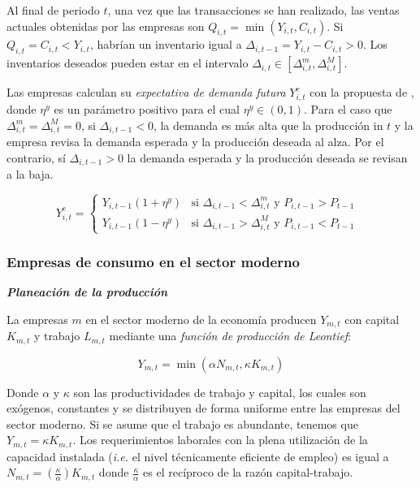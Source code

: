 \documentclass[12pt,a4paper]{article}
\begin{document}
Al final de periodo $t$, una vez que las transacciones se han realizado, las ventas actuales obtenidas por las empresas son $Q_{i,t}=\min(Y_{i,t},C_{i,t})$. Si $Q_{i,t}= C_{i,t} < Y_{i,t}$, habrían un inventario igual a $\Delta_{i,t-1}=Y_{i,t}-C_{i,t}>0$. Los inventarios deseados pueden estar en el intervalo $\Delta_{i,t} \in [\Delta_{i,t}^m,\Delta_{i,t}^M]$.

Las empresas calculan su \textit{expectativa de demanda futura} $Y_{i,t}^e$ con la propuesta de \cite{DAWID201863}, donde $\eta^y$ es un parámetro positivo para el cual $\eta^y \in (0,1)$. Para el caso que $\Delta_{i,t}^m=\Delta_{i,t}^M=0$, si $\Delta_{i,t-1} < 0$, la demanda es más alta que la producción in $t$ y la empresa revisa la demanda esperada y la producción deseada al alza. Por el contrario, sí $\Delta_{i,t-1} > 0$ la demanda esperada y la producción deseada se revisan a la baja.  

\begin{equation}
  Y_{i,t}^e =
    \begin{cases}
      Y_{i,t-1}(1 + \eta^y) & \text{si $\Delta_{i,t-1} < \Delta_{i,t}^m$ y $P_{i,t-1} > P_{t-1}$}\\
      Y_{i,t-1}(1 - \eta^y) & \text{si $\Delta_{i,t-1} > \Delta_{i,t}^M$ y $P_{i,t-1} < P_{t-1}$ }
      
    \end{cases}       
\end{equation}

\subsubsection{Empresas de consumo en el sector moderno}
\textbf{\textit{Planeación de la producción}}
\vspace{.2cm}

La empresas $m$ en el sector moderno de la economía producen $Y_{m,t}$ con capital $K_{m,t}$ y trabajo $L_{m,t}$ mediante una \textit{función de producción de Leontief}:

\begin{equation}
Y_{m,t}= \min(\alpha N_{m,t},\kappa K_{m,t})      
\end{equation}

Donde $\alpha$ y $\kappa$ son las productividades de trabajo y capital, los cuales son exógenos, constantes y se distribuyen de forma uniforme entre las empresas del sector moderno. Si se asume que el trabajo es abundante, tenemos que $Y_{m,t}=\kappa K_{m,t}$. Los requerimientos laborales con la plena utilización de la capacidad instalada (\textit{i.e.} el nivel técnicamente eficiente de empleo) es igual a $N_{m,t}=(\frac{\kappa}{\alpha})K_{m,t}$ donde $\frac{\kappa}{\alpha}$ es el recíproco de la razón capital-trabajo.
\end{document}
